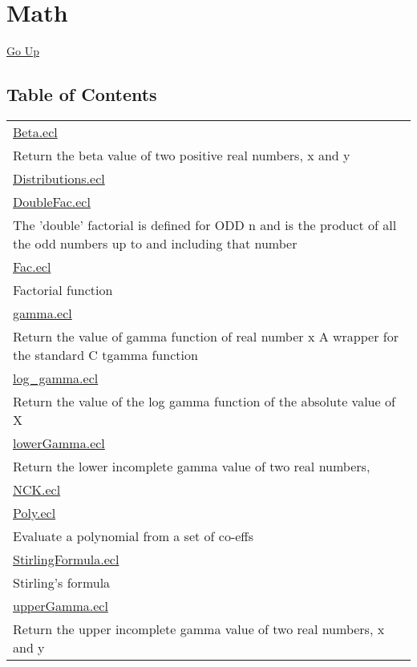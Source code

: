 \chapter*{\color{headtoc} Math}
\hypertarget{ecldoc:toc:root/ML_Core/Math}{}
\hyperlink{ecldoc:toc:}{Go Up}


\section*{Table of Contents}
{\renewcommand{\arraystretch}{1.5}
\begin{longtable}{|p{\textwidth}|}
\hline
\hyperlink{ecldoc:toc:ML_Core.Math.Beta}{Beta.ecl} \\
Return the beta value of two positive real numbers, x and y \\
\hline
\hyperlink{ecldoc:toc:ML_Core.Math.Distributions}{Distributions.ecl} \\
\hline
\hyperlink{ecldoc:toc:ML_Core.Math.DoubleFac}{DoubleFac.ecl} \\
The 'double' factorial is defined for ODD n and is the product of all the odd numbers up to and including that number \\
\hline
\hyperlink{ecldoc:toc:ML_Core.Math.Fac}{Fac.ecl} \\
Factorial function \\
\hline
\hyperlink{ecldoc:toc:ML_Core.Math.gamma}{gamma.ecl} \\
Return the value of gamma function of real number x A wrapper for the standard C tgamma function \\
\hline
\hyperlink{ecldoc:toc:ML_Core.Math.log_gamma}{log\_gamma.ecl} \\
Return the value of the log gamma function of the absolute value of X \\
\hline
\hyperlink{ecldoc:toc:ML_Core.Math.lowerGamma}{lowerGamma.ecl} \\
Return the lower incomplete gamma value of two real numbers, \\
\hline
\hyperlink{ecldoc:toc:ML_Core.Math.NCK}{NCK.ecl} \\
\hline
\hyperlink{ecldoc:toc:ML_Core.Math.Poly}{Poly.ecl} \\
Evaluate a polynomial from a set of co-effs \\
\hline
\hyperlink{ecldoc:toc:ML_Core.Math.StirlingFormula}{StirlingFormula.ecl} \\
Stirling's formula \\
\hline
\hyperlink{ecldoc:toc:ML_Core.Math.upperGamma}{upperGamma.ecl} \\
Return the upper incomplete gamma value of two real numbers, x and y \\
\hline
\end{longtable}
}












